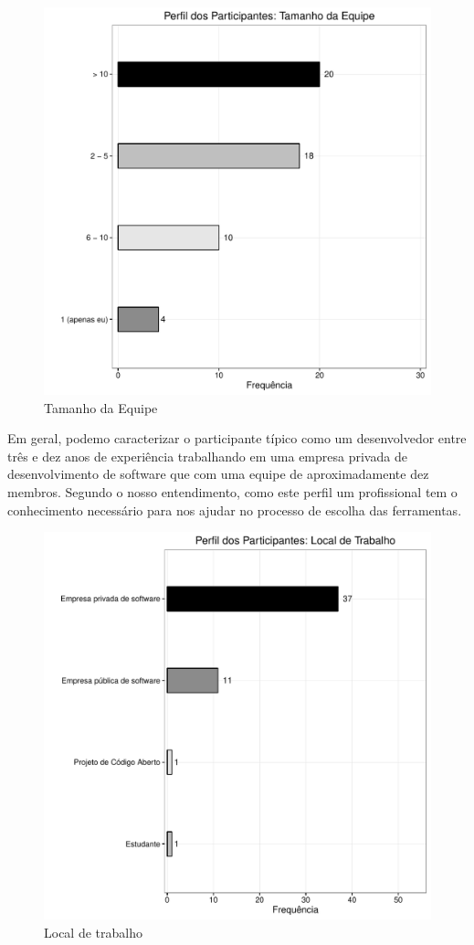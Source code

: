 \begin{figure}[htpb]
	\centering
	\includegraphics[width=0.8\linewidth]{./chapter-estudo-funcionalidades-fgrm/img/grafico_escolha_ferramentas_tamanho_equipe.pdf}
	\caption{Tamanho da Equipe}
\label{fig:grafico_escolha_ferramentas_tamanho_equipe}
\end{figure}

Em geral, podemo caracterizar o participante típico como um desenvolvedor entre
três e dez anos de experiência trabalhando em uma empresa privada de
desenvolvimento de software que com uma equipe de aproximadamente dez membros.
Segundo o nosso entendimento, como este perfil um profissional tem o
conhecimento necessário para nos ajudar no processo de escolha das ferramentas.

\begin{figure}[htpb]
	\centering
	\includegraphics[width=0.8\linewidth]{./chapter-estudo-funcionalidades-fgrm/img/grafico_escolha_ferramentas_local_trabalho.pdf}
	\caption{Local de trabalho}
\label{fig:grafico_escolha_ferramentas_local_trabalho}
\end{figure}

